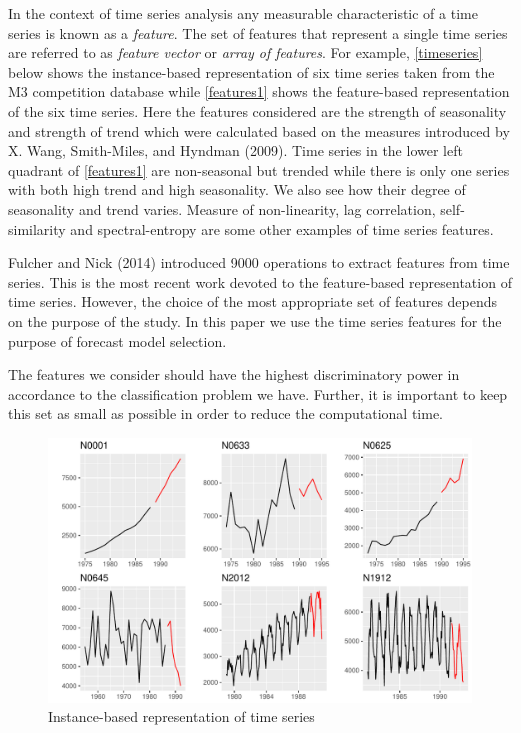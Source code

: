 \documentclass[11pt,]{article}
\theoremstyle{definition}
\theoremstyle{definition}
\theoremstyle{definition}
\theoremstyle{remark}
\begin{document}
In the context of time series analysis any measurable characteristic of
a time series is known as a \emph{feature}. The set of features that
represent a single time series are referred to as \emph{feature vector}
or \emph{array of features}. For example, \autoref{timeseries} below
shows the instance-based representation of six time series taken from
the M3 competition database while \autoref{features1} shows the
feature-based representation of the six time series. Here the features
considered are the strength of seasonality and strength of trend which
were calculated based on the measures introduced by X. Wang,
Smith-Miles, and Hyndman (2009). Time series in the lower left quadrant
of \autoref{features1} are non-seasonal but trended while there is only
one series with both high trend and high seasonality. We also see how
their degree of seasonality and trend varies. Measure of non-linearity,
lag correlation, self-similarity and spectral-entropy are some other
examples of time series features.

Fulcher and Nick (2014) introduced 9000 operations to extract features
from time series. This is the most recent work devoted to the
feature-based representation of time series. However, the choice of the
most appropriate set of features depends on the purpose of the study. In
this paper we use the time series features for the purpose of forecast
model selection.

The features we consider should have the highest discriminatory power in
accordance to the classification problem we have. Further, it is
important to keep this set as small as possible in order to reduce the
computational time.

\begin{figure}

{\centering \includegraphics[width=\textwidth]{figure/fig1-1} 

}

\caption{Instance-based representation of time series\label{timeseries}}\label{fig:fig1}
\end{figure}
\end{document}
